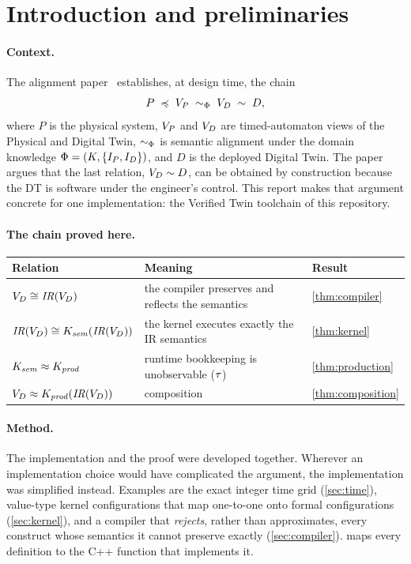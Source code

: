 \section{Introduction and preliminaries}\label{sec:intro}

\paragraph{Context.}
The alignment paper~\cite{icse} establishes, at design time, the chain
\[
  P \;\preccurlyeq\; V_P \;\sim_{\Phi}\; V_D \;\sim\; D,
\]
where $P$ is the physical system, $V_P$ and $V_D$ are timed-automaton views of
the Physical and Digital Twin, $\sim_{\Phi}$ is semantic alignment under the
domain knowledge $\Phi=(K,\{I_P,I_D\})$, and $D$ is the deployed Digital Twin.
The paper argues that the last relation, $V_D\sim D$, can be obtained by
construction because the DT is software under the engineer's control. This
report makes that argument concrete for one implementation: the Verified Twin
toolchain of this repository.

\paragraph{The chain proved here.}
\begin{center}
\begin{tabular}{@{}lll@{}}
\toprule
Relation & Meaning & Result \\ \midrule
$V_D \cong \mathit{IR}(V_D)$ & the compiler preserves and reflects the semantics & \cref{thm:compiler} \\
$\mathit{IR}(V_D) \cong K_{\mathit{sem}}(\mathit{IR}(V_D))$ & the kernel executes exactly the IR semantics & \cref{thm:kernel} \\
$K_{\mathit{sem}} \approx K_{\mathit{prod}}$ & runtime bookkeeping is unobservable ($\tau$) & \cref{thm:production} \\
$V_D \approx K_{\mathit{prod}}(\mathit{IR}(V_D))$ & composition & \cref{thm:composition} \\
\bottomrule
\end{tabular}
\end{center}

\paragraph{Method.}
The implementation and the proof were developed together. Wherever an
implementation choice would have complicated the argument, the
implementation was simplified instead. Examples are the exact integer time
grid (\cref{sec:time}), value-type kernel configurations that map one-to-one
onto formal configurations (\cref{sec:kernel}), and a compiler that
\emph{rejects}, rather than approximates, every construct whose semantics
it cannot preserve exactly (\cref{sec:compiler}).  maps every
definition to the C++ function that implements it.

